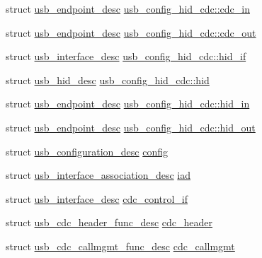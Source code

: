 \begin{DoxyCompactItemize}
\item 
struct \hyperlink{structusb__endpoint__desc}{usb\-\_\-endpoint\-\_\-desc} \hyperlink{group___p_i_o_s___u_s_b___d_e_s_c_ga599b79ff75341552732decb7763cc6c8}{usb\-\_\-config\-\_\-hid\-\_\-cdc\-::cdc\-\_\-in}
\item 
struct \hyperlink{structusb__endpoint__desc}{usb\-\_\-endpoint\-\_\-desc} \hyperlink{group___p_i_o_s___u_s_b___d_e_s_c_ga38856efc6dd6e0466e9bfb7533992dc3}{usb\-\_\-config\-\_\-hid\-\_\-cdc\-::cdc\-\_\-out}
\item 
struct \hyperlink{structusb__interface__desc}{usb\-\_\-interface\-\_\-desc} \hyperlink{group___p_i_o_s___u_s_b___d_e_s_c_gadeb93743c31b647e20653e4423233982}{usb\-\_\-config\-\_\-hid\-\_\-cdc\-::hid\-\_\-if}
\item 
struct \hyperlink{structusb__hid__desc}{usb\-\_\-hid\-\_\-desc} \hyperlink{group___p_i_o_s___u_s_b___d_e_s_c_ga8b4c52ed5995d3193869596bc47a4e58}{usb\-\_\-config\-\_\-hid\-\_\-cdc\-::hid}
\item 
struct \hyperlink{structusb__endpoint__desc}{usb\-\_\-endpoint\-\_\-desc} \hyperlink{group___p_i_o_s___u_s_b___d_e_s_c_gaf6d4567d3dfbf3397c5842bdef4e13c8}{usb\-\_\-config\-\_\-hid\-\_\-cdc\-::hid\-\_\-in}
\item 
struct \hyperlink{structusb__endpoint__desc}{usb\-\_\-endpoint\-\_\-desc} \hyperlink{group___p_i_o_s___u_s_b___d_e_s_c_gad76c86a5c7e42e823404bf0e7ddff4f2}{usb\-\_\-config\-\_\-hid\-\_\-cdc\-::hid\-\_\-out}
\item 
struct \hyperlink{structusb__configuration__desc}{usb\-\_\-configuration\-\_\-desc} \hyperlink{group___p_i_o_s___u_s_b___d_e_s_c_ga6517677dcb9452a3759e7ec7e360e690}{config}
\item 
struct \*
\hyperlink{structusb__interface__association__desc}{usb\-\_\-interface\-\_\-association\-\_\-desc} \hyperlink{group___p_i_o_s___u_s_b___d_e_s_c_gac7a66f23a9fc26df56f67aa5cc34dc5b}{iad}
\item 
struct \hyperlink{structusb__interface__desc}{usb\-\_\-interface\-\_\-desc} \hyperlink{group___p_i_o_s___u_s_b___d_e_s_c_ga9ca646cc7183c87c14d220ac2ccaba38}{cdc\-\_\-control\-\_\-if}
\item 
struct \hyperlink{structusb__cdc__header__func__desc}{usb\-\_\-cdc\-\_\-header\-\_\-func\-\_\-desc} \hyperlink{group___p_i_o_s___u_s_b___d_e_s_c_gaf41f2d1d7fbf8850ddc7ca678ca183aa}{cdc\-\_\-header}
\item 
struct \hyperlink{structusb__cdc__callmgmt__func__desc}{usb\-\_\-cdc\-\_\-callmgmt\-\_\-func\-\_\-desc} \hyperlink{group___p_i_o_s___u_s_b___d_e_s_c_ga97d1e106c41e1670bffdc7505b67eaef}{cdc\-\_\-callmgmt}

\end{DoxyCompactItemize}
